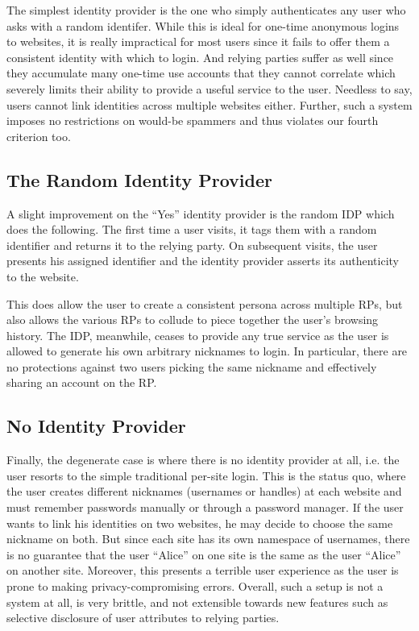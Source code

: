\documentclass{llncs}
\begin{document}
The simplest identity provider is the one who simply authenticates any user who
asks with a random identifer. While this is ideal for one-time anonymous logins
to websites, it is really impractical for most users since it fails to offer
them a consistent identity with which to login. And relying parties suffer as
well since they accumulate many one-time use accounts that they cannot correlate
which severely limits their ability to provide a useful service to the user.
Needless to say, users cannot link identities across multiple websites either.
Further, such a system imposes no restrictions on would-be spammers and thus
violates our fourth criterion too.

\subsection{The Random Identity Provider}

A slight improvement on the ``Yes'' identity provider is the random IDP which
does the following. The first time a user visits, it tags them with a random
identifier and returns it to the relying party. On subsequent visits, the user
presents his assigned identifier and the identity provider asserts its
authenticity to the website.

This does allow the user to create a consistent persona across multiple RPs, but
also allows the various RPs to collude to piece together the user's browsing
history. The IDP, meanwhile, ceases to provide any true service as the user is
allowed to generate his own arbitrary nicknames to login. In particular, there
are no protections against two users picking the same nickname and effectively
sharing an account on the RP.

\subsection{No Identity Provider}

Finally, the degenerate case is where there is no identity provider at all, i.e.
the user resorts to the simple traditional per-site login. This is the status
quo, where the user creates different nicknames (usernames or handles) at each
website and must remember passwords manually or through a password manager. If
the user wants to link his identities on two websites, he may decide to choose
the same nickname on both. But since each site has its own namespace of
usernames, there is no guarantee that the user ``Alice'' on one site is the same
as the user ``Alice'' on another site. Moreover, this presents a terrible user
experience as the user is prone to making privacy-compromising errors. Overall,
such a setup is not a system at all, is very brittle, and not extensible towards
new features such as selective disclosure of user attributes to relying parties.
\end{document}
